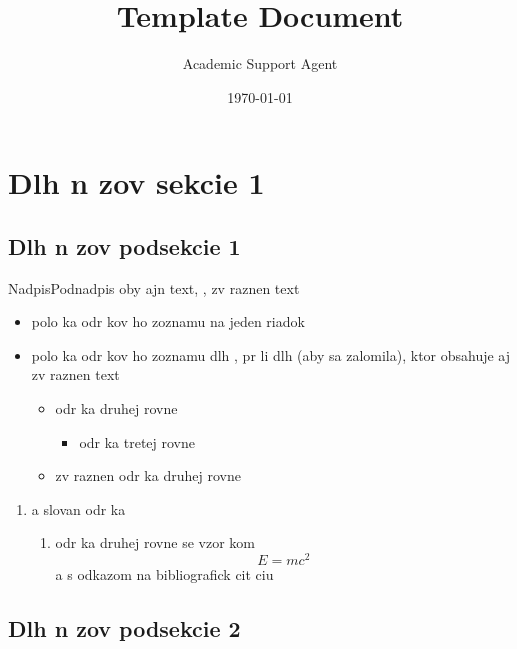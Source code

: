 \documentclass{article}
\title{Template Document}
\author{Academic Support Agent}
\date{\today}
\begin{document}
\maketitle

\begin{frame}[plain]
\maketitle
\end{frame}

\section[N zov sekcie 1]{Dlh  n zov sekcie 1}
\subsection[N zov podsekcie 1]{Dlh  n zov podsekcie 1}

\begin{frame}{Nadpis}{Podnadpis}
oby ajn  text, , \alert{zv raznen  text}
\begin{itemize}
  \item polo ka odr kov ho zoznamu na jeden riadok
  \item polo ka odr kov ho zoznamu dlh , pr li  dlh  (aby sa zalomila), ktor 
    obsahuje aj \alert{zv raznen  text}
  \begin{itemize}
    \item odr ka druhej  rovne
    \begin{itemize}
      \item odr ka tretej  rovne
    \end{itemize}
    \item \alert{zv raznen  odr ka druhej  rovne}
  \end{itemize}
\end{itemize}
\begin{enumerate}
  \item a  slovan  odr ka
  \begin{enumerate}
    \item odr ka druhej  rovne se vzor kom
      \[ E = mc^2 \]
      a s odkazom na bibliografick  cit ciu \cite{einstein1905tragheit}
  \end{enumerate}
\end{enumerate}
\end{frame}

\subsection[N zov podsekcie 2]{Dlh  n zov podsekcie 2}
\end{document}
